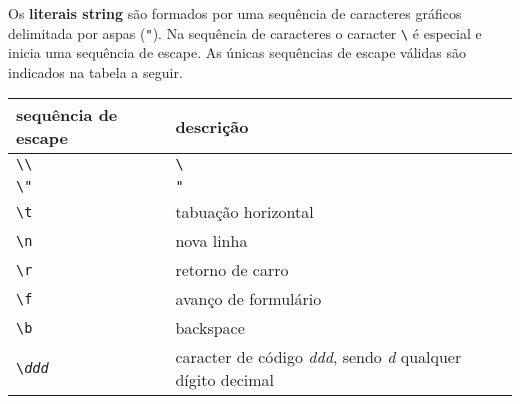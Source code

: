\documentclass[a4paper,10pt,brazil]{article}
\begin{document}
Os \textbf{literais string} são formados por uma sequência de caracteres
gráficos delimitada por aspas (\texttt{"}). Na sequência de caracteres o
caracter \texttt{\textbackslash} é especial e inicia uma sequência de
escape. As únicas sequências de escape válidas são indicados na tabela a
seguir.
\begin{center}
  \begin{tabular}{|l|l|}\hline
    \textbf{sequência de escape}                      & \textbf{descrição}                                                              \\\hline
    \texttt{\textbackslash \textbackslash}            & \texttt{\textbackslash}                                                         \\\hline
    \texttt{\textbackslash "}                         & \texttt{"}                                                                      \\\hline
    \texttt{\textbackslash t}                         & tabuação horizontal                                                             \\\hline
    \texttt{\textbackslash n}                         & nova linha                                                                      \\\hline
    \texttt{\textbackslash r}                         & retorno de carro                                                                \\\hline
    \texttt{\textbackslash f}                         & avanço de formulário                                                            \\\hline
    \texttt{\textbackslash b}                         & backspace                                                                       \\\hline
    \texttt{\textbackslash \emph{ddd}}                & caracter de código \emph{ddd}, sendo \emph{d} qualquer dígito decimal           \\\hline
  \end{tabular}
\end{center}

\end{document}
